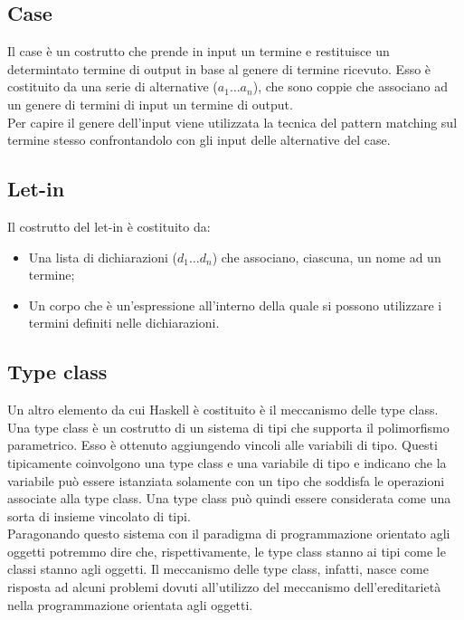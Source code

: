 \documentclass[12pt,a4paper,openright,twoside]{report}
\begin{document}
\subsection{Case}
Il case è un costrutto che prende in input un termine e restituisce un determintato termine di output in base al genere di termine ricevuto. Esso è costituito da una serie di alternative ($a_1 \ldots a_n$), che sono coppie che associano ad un genere di termini di input un termine di output.\\
Per capire il genere dell'input viene utilizzata la tecnica del pattern matching sul termine stesso confrontandolo con gli input delle alternative del case.

\subsection{Let-in}
Il costrutto del let-in è costituito da:
\begin{itemize}
 \item Una lista di dichiarazioni ($d_1 \ldots d_n$) che associano, ciascuna, un nome ad un termine;
 \item Un corpo che è un'espressione all'interno della quale si possono utilizzare i termini definiti nelle dichiarazioni.
\end{itemize}

\subsection{Type class}
Un altro elemento da cui Haskell è costituito è il meccanismo delle type class. Una type class è un costrutto di un sistema di tipi che supporta il polimorfismo parametrico. Esso è ottenuto aggiungendo vincoli alle variabili di tipo. Questi tipicamente coinvolgono una type class e una variabile di tipo e indicano che la variabile può essere istanziata solamente con un tipo che soddisfa le operazioni associate alla type class. Una type class può quindi essere considerata come una sorta di insieme vincolato di tipi.\\
Paragonando questo sistema con il paradigma di programmazione orientato agli oggetti potremmo dire che, rispettivamente, le type class stanno ai tipi come le classi stanno agli oggetti. Il meccanismo delle type class, infatti, nasce come risposta ad alcuni problemi dovuti all'utilizzo del meccanismo dell'ereditarietà nella programmazione orientata agli oggetti.

\clearpage{\pagestyle{empty}\cleardoublepage}	%
\end{document}
